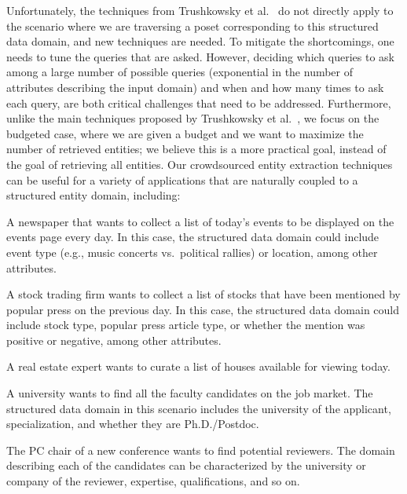 Unfortunately, the techniques from Trushkowsky et al.~\cite{trushkowsky:2013} do not directly apply to the scenario where we are traversing a poset corresponding to this structured data domain, and new techniques are needed. To mitigate the shortcomings, one needs to tune the queries that are asked. However, deciding which queries to ask among a large number of possible queries (exponential in the number of attributes describing the input domain) and when and how many times to ask each query, are both critical challenges that need to be addressed. Furthermore, unlike the main techniques proposed by Trushkowsky et al.~\cite{trushkowsky:2013}, we focus on the budgeted case, where we are given a budget and we want to maximize the number of retrieved entities; we believe this is a more practical goal, instead of the goal of retrieving all entities.  
Our crowdsourced entity extraction techniques can be useful for a variety of applications that are naturally coupled to a structured entity domain, including:
\squishlist
\item A newspaper that wants to collect a list of today's events to be displayed on the events page every day. 
In this case, the structured data domain could include event type (e.g., music concerts vs.~political rallies) or location, among other attributes.
\item A stock trading firm wants to collect a list of stocks that have been mentioned by popular press on the previous day. In this case, the structured data domain could include stock type, popular press article type, or whether the mention was positive or negative, among other attributes. 
\item A real estate expert wants to curate a list of houses available for viewing today. 
\item A university wants to find all the faculty candidates on the job market. The structured data domain in this scenario includes the university of the applicant, specialization, and whether they are Ph.D./Postdoc.
\item The PC chair of a new conference wants to find potential reviewers. The domain describing each of the candidates can be characterized by the university or company of the reviewer, expertise, qualifications, and so on. 
\squishend

